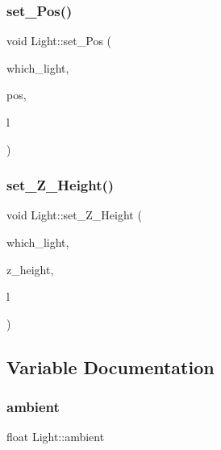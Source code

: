 \mbox{\label{namespace_light_a12c8f1679ee83b00f2992639286815ec}} 
\subsubsection{\texorpdfstring{set\+\_\+\+Pos()}{set\_Pos()}}
{\footnotesize\ttfamily void Light\+::set\+\_\+\+Pos (\begin{DoxyParamCaption}\item[{int}]{which\+\_\+light,  }\item[{\mbox{\hyperlink{struct_vec2_d_1_1_vec2_d}{Vec2\+D\+::\+Vec2D}} $\ast$}]{pos,  }\item[{\mbox{\hyperlink{struct_light_1_1_factory}{Factory}} $\ast$}]{l }\end{DoxyParamCaption})}

\mbox{\label{namespace_light_a0f7928ed04593f7efcd4acd950213dc7}} 
\subsubsection{\texorpdfstring{set\+\_\+\+Z\+\_\+\+Height()}{set\_Z\_Height()}}
{\footnotesize\ttfamily void Light\+::set\+\_\+\+Z\+\_\+\+Height (\begin{DoxyParamCaption}\item[{int}]{which\+\_\+light,  }\item[{float}]{z\+\_\+height,  }\item[{\mbox{\hyperlink{struct_light_1_1_factory}{Factory}} $\ast$}]{l }\end{DoxyParamCaption})}



\subsection{Variable Documentation}
\mbox{\label{namespace_light_a21c7a12e7bde61498339444442a678f2}} 
\subsubsection{\texorpdfstring{ambient}{ambient}}
{\footnotesize\ttfamily float Light\+::ambient}

